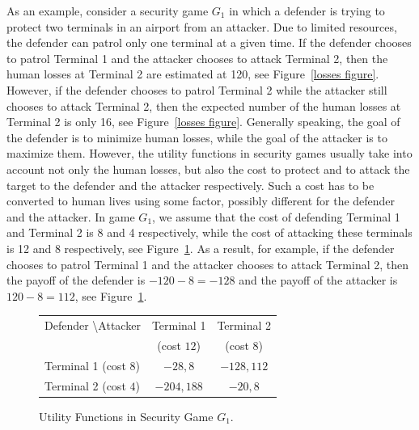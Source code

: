 \documentclass[letterpaper]{article}
\begin{document}
As an example, consider a security game $G_1$ in which a defender is trying to protect two terminals in an airport from an attacker. Due to limited resources, the defender can patrol only one terminal at a given time. If the defender chooses to patrol Terminal 1 and the attacker chooses to attack Terminal 2, then the human losses at Terminal 2 are estimated at 120, see Figure~\ref{losses figure}. However, if the defender chooses to patrol Terminal 2 while the attacker still chooses to attack Terminal 2, then the expected number of the human losses at Terminal 2 is only 16, see Figure~\ref{losses figure}. Generally speaking, the goal of the defender is to minimize human losses, while the goal of the attacker is to maximize them. However, the utility functions in security games usually take into account not only the human losses, but also the cost to protect and to attack the target to the defender and the attacker respectively. Such a cost has to be converted to human lives using some factor, possibly different for the defender and the attacker. In game $G_1$, we assume that the cost of defending Terminal 1 and Terminal 2 is 8 and 4 respectively, while the cost of attacking these terminals is 12 and 8 respectively, see Figure~\ref{utility figure}.  As a result, for example, if the defender chooses to patrol Terminal 1 and the attacker chooses to attack Terminal 2, then the payoff of the defender is $-120-8=-128$ and the payoff of the attacker is $120-8=112$, see Figure~\ref{utility figure}.

\begin{figure}[ht]
\begin{center}
\renewcommand{\arraystretch}{1.3}
\begin{tabular}{ l | c  c }
Defender \textbackslash Attacker  & Terminal 1 & Terminal 2  \\ [-1ex]
                                & (cost $12$) & (cost $8$)\\ \hline
 Terminal 1 (cost $8$) & $-28,8$ & $-128,112$ \\
 Terminal 2 (cost $4$) & $-204,188$ &  $-20,8$
\end{tabular}
\caption{Utility Functions in Security Game $G_1$.}\label{utility figure}
\end{center}
\end{figure}
\end{document}
